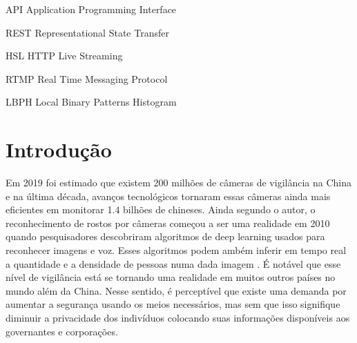 \documentclass[12pt, %
openright, 
oneside, %
a4paper,    %
brazil]{facom-ufu-abntex2}
\begin{document}
\begin{siglas} %
  \item[API] Application Programming Interface
  \item[REST] Representational State Transfer
  \item[HSL] HTTP Live Streaming
  \item[RTMP] Real Time Messaging Protocol
  \item[LBPH] Local Binary Patterns Histogram
\end{siglas}


\tableofcontents*
\cleardoublepage

\textual


\chapter[Introdução]{Introdução}
Em 2019 foi estimado que existem 200 milhões de câmeras de vigilância na China e na última década,
avanços tecnológicos tornaram essas câmeras ainda mais eficientes em monitorar 1.4 bilhões de chineses.
Ainda segundo o autor, o reconhecimento de rostos por câmeras começou a ser uma realidade em 2010 quando pesquisadores
descobriram algoritmos de deep learning usados para reconhecer imagens e voz. Esses algoritmos podem
ambém inferir em tempo real a quantidade e a densidade de pessoas numa dada imagem
\cite{qiang2019road}. É notável que esse nível de vigilância está se tornando uma realidade em muitos outros
países no mundo além da China. Nesse sentido, é perceptível que existe uma demanda por aumentar a segurança usando os meios
necessários, mas sem que isso signifique diminuir a privacidade dos indivíduos colocando suas informações disponíveis aos
governantes e corporações.
\end{document}
